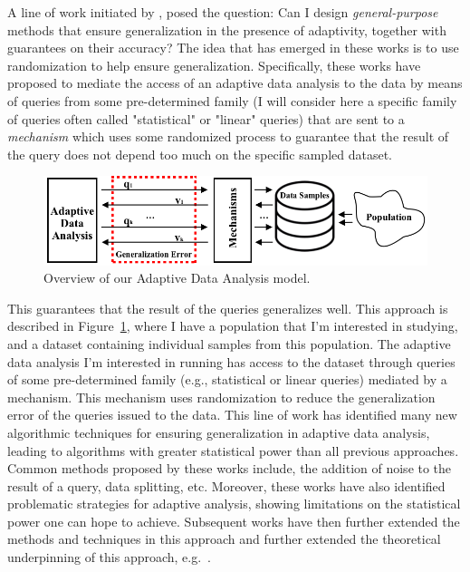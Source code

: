 A line of work initiated by \cite{DworkFHPRR15}, \cite{HardtU14} posed the question: Can I design \emph{general-purpose} methods that ensure generalization in the presence of adaptivity, together with guarantees on their accuracy?  
The idea that has emerged in these works is to use randomization to help ensure generalization. 
Specifically, these works have proposed to mediate the access of an adaptive data analysis to the data by means of queries from some pre-determined family (I will consider here a specific family of queries often called "statistical" or "linear" queries) that are sent to a 
\emph{mechanism} which uses some randomized process to guarantee that the result of the query does not depend too much on the specific
sampled dataset. 
%
\begin{figure}
    \centering
    \includegraphics[width=0.7\columnwidth]{figures/data_analysis_model.png}
    \caption{Overview of our Adaptive Data Analysis model.}
    \label{fig:adaptivity-model-overview}
\vspace{-0.5cm}
\end{figure}
This guarantees that the result of the queries generalizes well. 
This approach is described in Figure~\ref{fig:adaptivity-model-overview}, where
I have a population that I'm interested in studying, and a dataset containing individual samples from this population. The adaptive data analysis I'm interested in running has access to the dataset through queries of some pre-determined family (e.g., statistical or linear queries) mediated by a mechanism. 
This mechanism uses randomization to reduce the generalization error of the queries issued to the data.
This line of work has identified many new algorithmic techniques for ensuring generalization in adaptive data analysis, leading to algorithms with greater statistical power than all previous approaches. 
Common methods proposed by these works include, the addition of noise to the result of a query, data splitting, etc. 
Moreover, these works have also identified problematic strategies for adaptive analysis, showing limitations on the statistical power one can hope to achieve. 
Subsequent works have then further extended the methods and techniques in this approach and further extended the theoretical underpinning of this approach, 
e.g.~\cite{dwork2015reusable,dwork2015generalization,BassilyNSSSU16,UllmanSNSS18,FeldmanS17,jung2019new,SteinkeZ20,RogersRSSTW20}.
%

